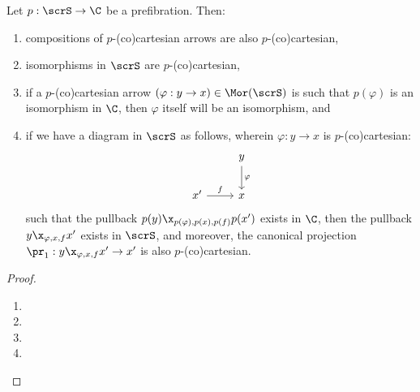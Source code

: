             \begin{proposition} \label{prop: properties_of_(co)cartesian_arrows_in_a_prefibration}
                Let $p: \scrS \to \C$ be a prefibration. Then:
                    \begin{enumerate}
                        \item compositions of $p$-(co)cartesian arrows are also $p$-(co)cartesian,
                        \item isomorphisms in $\scrS$ are $p$-(co)cartesian, 
                        \item if a $p$-(co)cartesian arrow $(\varphi: y \to x) \in \Mor(\scrS)$ is such that $p(\varphi)$ is an isomorphism in $\C$, then $\varphi$ itself will be an isomorphism, and
                        \item if we have a diagram in $\scrS$ as follows, wherein $\varphi: y \to x$ is $p$-(co)cartesian:
                            $$
                                \begin{tikzcd}
                                	& y \\
                                	{x'} & x
                                	\arrow["\varphi", from=1-2, to=2-2]
                                	\arrow["f", from=2-1, to=2-2]
                                \end{tikzcd}
                            $$
                        such that the pullback $p(y) \x_{p(\varphi), p(x), p(f)} p(x')$ exists in $\C$, then the pullback $y \x_{\varphi, x, f} x'$ exists in $\scrS$, and moreover, the canonical projection $\pr_1: y \x_{\varphi, x, f} x' \to x'$ is also $p$-(co)cartesian.
                    \end{enumerate}
            \end{proposition}
                \begin{proof}
                    \noindent
                    \begin{enumerate}
                        \item 
                        \item 
                        \item 
                        \item 
                    \end{enumerate}
                \end{proof}
